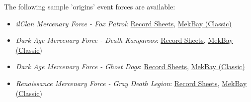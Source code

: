 The following sample 'origins' event forces are available:

\begin{itemize}

\item \emph{ilClan Mercenary Force - Fox Patrol}: \href{https://raw.githubusercontent.com/Eudicods/outworlds-wastes/rules-pdf/origins-fox-patrol.pdf}{Record Sheets}, \href{https://mekbay.com/?units=Outworlds%20Wastes~BMUller_F,BMLocust_LCT5M,BMQuickdraw_QKD5M,BAISStandardBattleArmor_LaserSqd4&name=Fox%20Patrol&gs=cbt}{MekBay (Classic)}

\item \emph{Dark Age Mercenary Force - Death Kangaroos}: \href{https://raw.githubusercontent.com/Eudicods/outworlds-wastes/rules-pdf/origins-death-kangaroos.pdf}{Record Sheets}, \href{https://mekbay.com/?units=Outworlds%20Wastes~BMBlackjack_BJ3,BMCommando_COM7S,BMCommando_COM8S,BMPanther_PNT12A,BAISStandardBattleArmor_MagneticSqd4&name=Death%20Kangaroos&gs=cbt}{MekBay (Classic)}

\item \emph{Dark Age Mercenary Force - Ghost Dogs}: \href{https://raw.githubusercontent.com/Eudicods/outworlds-wastes/rules-pdf/origins-ghost-dogs.pdf}{Record Sheets}, \href{https://mekbay.com/?units=Outworlds%20Wastes~BMWolfhound_WLF1,BMValkyrie_C,BMHound_HD2F,BAISStandardBattleArmor_MagneticSqd4&name=Ghost%20Dogs&gs=cbt}{MekBay (Classic)}

\item \emph{Renaissance Mercenary Force - Gray Death Legion}: \href{https://raw.githubusercontent.com/Eudicods/outworlds-wastes/rules-pdf/origins-gray-death.pdf}{Record Sheets},  \href{https://mekbay.com/?units=Outworlds%20Wastes~BMShadowHawk_SHD2H:3:4,BMLocust_LCT3V,BMLocust_LCT1V:3:4,BMStinger_STG3G:3:4,CIMotorizedPlatoon_Rifle:3:4&name=Gray%20Death%20Legion&gs=cbt}{MekBay (Classic)}

\end{itemize}
